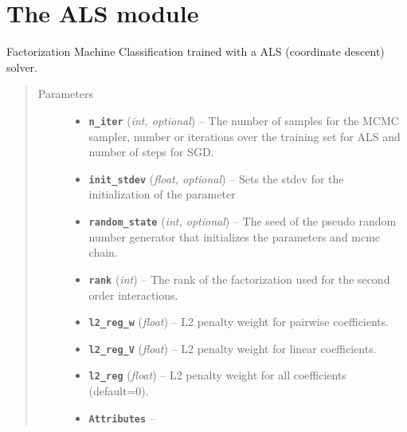 \documentclass[letterpaper,10pt,english]{sphinxmanual}
\begin{document}
\section{The ALS module}
\label{api:the-als-module}\label{api:module-fastFM.als}

\begin{fulllineitems}
\label{api:fastFM.als.FMClassification}
Factorization Machine Classification trained with a ALS
(coordinate descent)
solver.
\begin{quote}\begin{description}
\item[{Parameters}] \leavevmode\begin{itemize}
\item {} 
\textbf{\texttt{n\_iter}} (\emph{int, optional}) -- The number of samples for the MCMC sampler, number or iterations over
the training set for ALS and number of steps for SGD.

\item {} 
\textbf{\texttt{init\_stdev}} (\emph{float, optional}) -- Sets the stdev  for the initialization of the parameter

\item {} 
\textbf{\texttt{random\_state}} (\emph{int, optional}) -- The seed of the pseudo random number generator that
initializes the parameters and mcmc chain.

\item {} 
\textbf{\texttt{rank}} (\emph{int}) -- The rank of the factorization used for the second order interactions.

\item {} 
\textbf{\texttt{l2\_reg\_w}} (\emph{float}) -- L2 penalty weight for pairwise coefficients.

\item {} 
\textbf{\texttt{l2\_reg\_V}} (\emph{float}) -- L2 penalty weight for linear coefficients.

\item {} 
\textbf{\texttt{l2\_reg}} (\emph{float}) -- L2 penalty weight for all coefficients (default=0).

\item {} 
\textbf{\texttt{Attributes}} -- 


\end{itemize}
\end{description}
\end{quote}
\end{fulllineitems}
\end{document}
